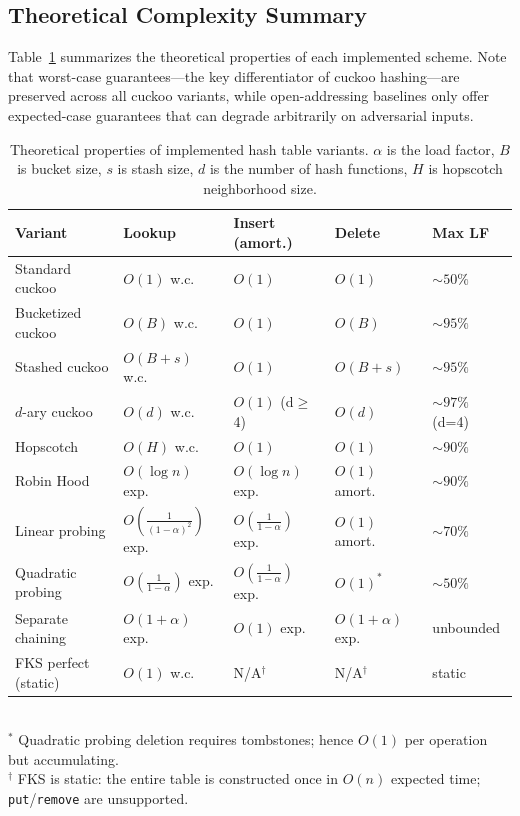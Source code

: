 \documentclass[10pt,journal,compsoc]{IEEEtran}
\begin{document}
\subsection{Theoretical Complexity Summary}
Table~\ref{tab:complexity} summarizes the theoretical properties of each implemented scheme. Note that worst-case guarantees---the key differentiator of cuckoo hashing---are preserved across all cuckoo variants, while open-addressing baselines only offer expected-case guarantees that can degrade arbitrarily on adversarial inputs.

\begin{table}[h]
\centering
\caption{Theoretical properties of implemented hash table variants. $\alpha$ is the load factor, $B$ is bucket size, $s$ is stash size, $d$ is the number of hash functions, $H$ is hopscotch neighborhood size.}
\label{tab:complexity}
\small
\begin{tabular}{@{}p{2.1cm}p{1.1cm}p{1.2cm}p{0.8cm}p{1.4cm}@{}}
\toprule
Variant & Lookup & Insert (amort.) & Delete & Max LF \\
\midrule
Standard cuckoo        & $O(1)$ w.c.    & $O(1)$         & $O(1)$  & $\sim 50\%$ \\
Bucketized cuckoo      & $O(B)$ w.c.    & $O(1)$         & $O(B)$  & $\sim 95\%$ \\
Stashed cuckoo         & $O(B{+}s)$ w.c.& $O(1)$         & $O(B{+}s)$ & $\sim 95\%$ \\
$d$-ary cuckoo         & $O(d)$ w.c.    & $O(1)$ (d$\ge$4) & $O(d)$ & $\sim 97\%$ (d=4) \\
Hopscotch              & $O(H)$ w.c.    & $O(1)$         & $O(1)$  & $\sim 90\%$ \\
Robin Hood             & $O(\log n)$ exp. & $O(\log n)$ exp. & $O(1)$ amort. & $\sim 90\%$ \\
Linear probing         & $O(\tfrac{1}{(1-\alpha)^2})$ exp. & $O(\tfrac{1}{1-\alpha})$ exp. & $O(1)$ amort. & $\sim 70\%$ \\
Quadratic probing      & $O(\tfrac{1}{1-\alpha})$ exp. & $O(\tfrac{1}{1-\alpha})$ exp. & $O(1)^*$ & $\sim 50\%$ \\
Separate chaining      & $O(1+\alpha)$ exp. & $O(1)$ exp. & $O(1+\alpha)$ exp. & unbounded \\
FKS perfect (static)   & $O(1)$ w.c.    & N/A$^\dagger$ & N/A$^\dagger$ & static \\
\bottomrule
\end{tabular}\\[2pt]
$^*$ Quadratic probing deletion requires tombstones; hence $O(1)$ per operation but accumulating.\\
$^\dagger$ FKS is static: the entire table is constructed once in $O(n)$ expected time; \texttt{put}/\texttt{remove} are unsupported.
\end{table}
\end{document}
